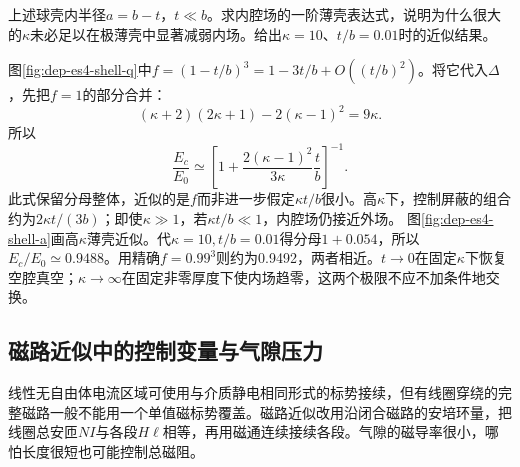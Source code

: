\begin{example}[薄壳和高介电常数的极限次序]
上述球壳内半径$a=b-t$，$t\ll b$。求内腔场的一阶薄壳表达式，说明为什么很大的$\kappa$未必足以在极薄壳中显著减弱内场。给出$\kappa=10$、$t/b=0.01$时的近似结果。
\end{example}
\begin{solution}
图\ref{fig:dep-es4-shell-q}中$f=(1-t/b)^3=1-3t/b+O((t/b)^2)$。将它代入$\Delta$，先把$f=1$的部分合并：
\[
 (\kappa+2)(2\kappa+1)-2(\kappa-1)^2=9\kappa.
\]
所以
\[
 \frac{E_c}{E_0}\simeq
 \left[1+\frac{2(\kappa-1)^2}{3\kappa}\frac tb\right]^{-1}.
\]
此式保留分母整体，近似的是$f$而非进一步假定$\kappa t/b$很小。高$\kappa$下，控制屏蔽的组合约为$2\kappa t/(3b)$；即使$\kappa\gg1$，若$\kappa t/b\ll1$，内腔场仍接近外场。
图\ref{fig:dep-es4-shell-a}画高$\kappa$薄壳近似。代$\kappa=10,t/b=0.01$得分母$1+0.054$，所以$E_c/E_0\simeq0.9488$。用精确$f=0.99^3$则约为0.9492，两者相近。$t\to0$在固定$\kappa$下恢复空腔真空；$\kappa\to\infty$在固定非零厚度下使内场趋零，这两个极限不应不加条件地交换。
\end{solution}

\subsection{磁路近似中的控制变量与气隙压力}
线性无自由体电流区域可使用与介质静电相同形式的标势接续，但有线圈穿绕的完整磁路一般不能用一个单值磁标势覆盖。磁路近似改用沿闭合磁路的安培环量，把线圈总安匝$NI$与各段$H\ell$相等，再用磁通连续接续各段。气隙的磁导率很小，哪怕长度很短也可能控制总磁阻。

